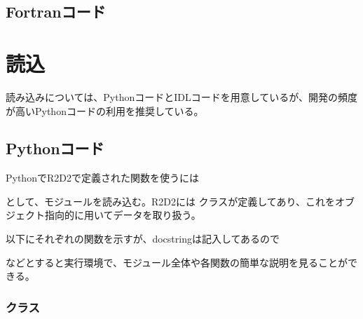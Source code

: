 \documentclass[letterpaper,10pt,dvipdfmx,report]{sphinxmanual}
\begin{document}
\subsection{Fortranコード}
\label{\detokenize{io:fortran}}

\section{読込}
\label{\detokenize{io:id3}}
読み込みについては、PythonコードとIDLコードを用意しているが、開発の頻度が高いPythonコードの利用を推奨している。


\subsection{Pythonコード}
\label{\detokenize{io:module-R2D2}}\label{\detokenize{io:python}}
PythonでR2D2で定義された関数を使うには

\begin{sphinxVerbatim}[commandchars=\\\{\}]
 
\end{sphinxVerbatim}

として、モジュールを読み込む。R2D2には {\hyperref[\detokenize{io:R2D2.R2D2_data}]{}} クラスが定義してあり、これをオブジェクト指向的に用いてデータを取り扱う。

以下にそれぞれの関数を示すが、docstringは記入してあるので

\begin{sphinxVerbatim}[commandchars=\\\{\}]
\end{sphinxVerbatim}

などとすると実行環境で、モジュール全体や各関数の簡単な説明を見ることができる。


\subsubsection{クラス}
\label{\detokenize{io:id4}}

\begin{fulllineitems}
\label{\detokenize{io:R2D2.R2D2_data}}
\end{fulllineitems}
\end{document}
